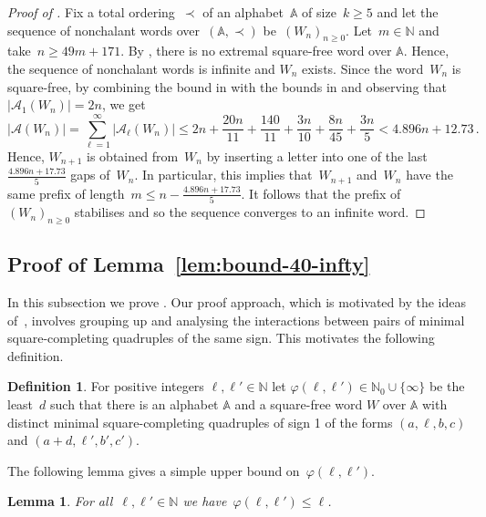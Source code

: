\documentclass[12pt]{article}
\theoremstyle{plain}
\newtheorem{lemma}[theorem]{Lemma}
\theoremstyle{definition}
\newtheorem{definition}[theorem]{Definition}
\newcommand\N{\mathbb{N}}
\newcommand{\A}{\mathbb A}
\newcommand{\cA}{\mathcal A}
\newcommand{\f}{\varphi}
\newcommand{\abs}[1]{\mathopen{}\left\lvert#1\right\rvert\mathclose{}}
\begin{document}
	\begin{proof}[Proof of ]
		Fix a total ordering~$\prec$ of an alphabet~$\A$ of size~$k\ge5$ and let the sequence of nonchalant words over~$(\A,\prec)$ be~$(W_n)_{n\ge0}$. Let~$m\in\N$ and take~$n\ge49m+171$. By , there is no extremal square-free word over $\A$. Hence, the sequence of nonchalant words is infinite and $W_n$ exists. Since the word~$W_n$ is square-free, by combining the bound in  with the bounds in  and observing that~$\abs{\cA_1(W_n)}=2n$, we get
		\[\abs{\cA(W_n)}=\sum_{\ell=1}^{\infty}\abs{\cA_{\ell}(W_n)} \le 2n + \frac{20n}{11}+\frac{140}{11} + \frac{3n}{10} + \frac{8n}{45} + \frac{3n}{5}< 4.896n + 12.73\,.\]
		Hence, $W_{n+1}$ is obtained from~$W_n$ by inserting a letter into one of the last~$\frac{4.896n + 17.73}{5}$ gaps of~$W_n$. In particular, this implies that~$W_{n+1}$ and~$W_n$ have the same prefix of length~$m\le n-\frac{4.896n + 17.73}{5}$. It follows that the prefix of~$(W_n)_{n\ge0}$ stabilises and so the sequence converges to an infinite word.
	\end{proof}
	
	\subsection{Proof of Lemma~\ref{lem:bound-40-infty}} \label{ssec:proof-bound-40-infty}
	
	In this subsection we prove . Our proof approach, which is motivated by the ideas of~\cite{HongZhang}, involves grouping up and analysing the interactions between pairs of minimal square-completing quadruples of the same sign. This motivates the following definition.
	
	\begin{definition}
		For positive integers $\ell,\ell'\in\N$ let $\f(\ell,\ell')\in \N_0\cup \{\infty\}$ be the least~$d$ such that there is an alphabet $\A$ and a square-free word $W$ over $\A$ with distinct minimal square-completing quadruples of sign 1 of the forms $(a,\ell,b,c)$ and $(a+d,\ell',b',c')$.
	\end{definition}
	
	The following lemma gives a simple upper bound on~$\f(\ell,\ell')$.
	
	\begin{lemma} \label{lem:gap-upper-bound}
		For all~$\ell,\ell'\in\N$ we have~$\f(\ell,\ell')\le\ell$.
	\end{lemma}
	
\end{document}

